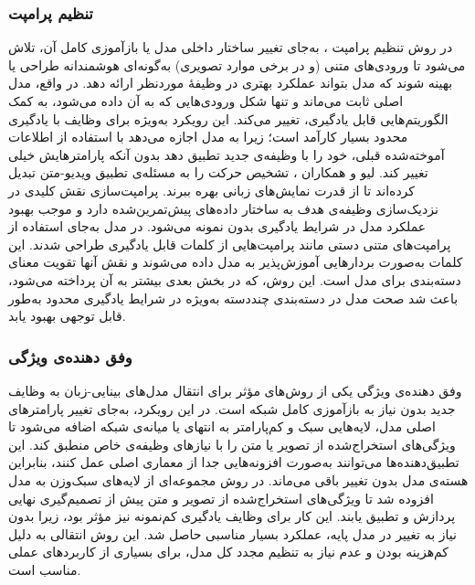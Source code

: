 \subsubsection{تنظیم پرامپت}
در روش تنظیم پرامپت
،
 به‌جای تغییر ساختار داخلی مدل یا بازآموزی کامل آن، تلاش می‌شود تا ورودی‌های متنی (و در برخی موارد تصویری) به‌گونه‌ای هوشمندانه طراحی یا بهینه شوند که مدل بتواند عملکرد بهتری در وظیفۀ موردنظر ارائه دهد. در واقع، مدل اصلی ثابت می‌ماند و تنها شکل ورودی‌هایی که به آن داده می‌شود، به کمک الگوریتم‌هایی قابل یادگیری، تغییر می‌کند. این رویکرد به‌ویژه برای وظایف با یادگیری محدود بسیار کارآمد است؛ زیرا به مدل اجازه می‌دهد با استفاده از اطلاعات آموخته‌شده قبلی، خود را با وظیفه‌ی جدید تطبیق دهد بدون آنکه پارامتر‌هایش خیلی تغییر کند. لیو و همکاران 
\cite{actionclip}،
تشخیص حرکت را به مسئله‌ی تطبیق ویدیو-متن تبدیل کرده‌اند تا از قدرت نمایش‌های زبانی بهره ببرند. پرامپت‌سازی نقش کلیدی در نزدیک‌سازی وظیفه‌ی هدف به ساختار داده‌های پیش‌تمرین‌شده دارد و موجب بهبود عملکرد مدل در شرایط یادگیری بدون نمونه می‌شود. در مدل 
\cite{CoOp}
به‌جای استفاده از پرامپت‌های متنی دستی مانند
پرامپت‌هایی از کلمات قابل یادگیری طراحی شدند. این کلمات به‌صورت بردارهایی آموزش‌پذیر به مدل داده می‌شوند و نقش آنها تقویت معنای دسته‌بندی برای مدل است. این روش، که در بخش بعدی بیشتر به آن پرداخته می‌شود، باعث شد صحت مدل
در دسته‌بندی چند‌دسته به‌ویژه در شرایط یادگیری محدود به‌طور قابل توجهی بهبود یابد. 

\subsubsection{وفق دهنده‌ی ویژگی}
وفق دهنده‌ی ویژگی
یکی از روش‌های مؤثر برای انتقال مدل‌های بینایی-زبان به وظایف جدید بدون نیاز به بازآموزی کامل شبکه است. در این رویکرد، به‌جای تغییر پارامتر‌های اصلی مدل، لایه‌هایی سبک و کم‌پارامتر به انتهای یا میانه‌ی شبکه اضافه می‌شود تا ویژگی‌های استخراج‌شده از تصویر یا متن را با نیازهای وظیفه‌ی خاص منطبق کند. این تطبیق‌دهنده‌ها  می‌توانند به‌صورت افزونه‌هایی جدا از معماری اصلی عمل کنند، بنابراین هسته‌ی مدل بدون تغییر باقی می‌ماند. در روش 
\cite{CLIP-Adapter}
مجموعه‌ای از لایه‌های سبک‌وزن به مدل
افزوده شد تا ویژگی‌های استخراج‌شده از تصویر و متن پیش از تصمیم‌گیری نهایی پردازش و تطبیق یابند. این کار برای وظایف یادگیری کم‌نمونه نیز مؤثر بود، زیرا بدون نیاز به تغییر در مدل پایه، عملکرد بسیار مناسبی حاصل شد. این روش انتقالی به دلیل کم‌هزینه بودن و عدم نیاز به تنظیم مجدد کل مدل، برای بسیاری از کاربردهای عملی مناسب است.

